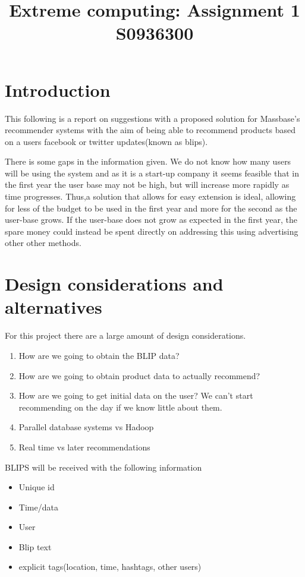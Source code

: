 \documentclass[11pt]{article}
\begin{document}
\title{Extreme computing: Assignment 1 \\ S0936300}
\maketitle

\section{Introduction}

This following is a report on suggestions with a proposed solution for Massbase's recommender systems with the aim of being able to recommend products based on a users facebook or twitter updates(known as blips).

There is some gaps in the information given. We do not know how many users will be using the system and as it is a start-up company it seems feasible that in the first year the user base may not be high, but will increase more rapidly as time progresses. Thus,a solution that allows for easy extension is ideal, allowing for less of the budget to be used in the first year and more for the second as the user-base grows. If the user-base does not grow as expected in the first year, the spare money could instead be spent directly on addressing this using advertising other other methods.

\section{Design considerations and alternatives}

For this project there are a large amount of design considerations.

\begin{enumerate}
\item How are we going to obtain the BLIP data?
\item How are we going to obtain product data to actually recommend?
\item How are we going to get initial data on the user? We can't start recommending on the day if we know little about them.
\item Parallel database systems vs Hadoop
\item Real time vs later recommendations
\end{enumerate}

BLIPS will be received with the following information

\begin{itemize}
\item Unique id
\item Time/data
\item User
\item Blip text
\item explicit tags(location, time, hashtags, other users)
\end{itemize}
\end{document}
